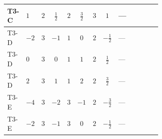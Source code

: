 \documentclass[8pt]{article}
\begin{document}
\begin{landscape}
\begin{longtable}{@{}llcccccc >{\raggedright\arraybackslash}p{0.21\linewidth} >{\raggedright\arraybackslash}p{0.21\linewidth} >{\raggedright\arraybackslash}p{0.21\linewidth}@{}}
\midrule
T3-C & $1$ & $2$ & $\frac{1}{2}$ & $2$ & $\frac{3}{2}$ & $3$ & $1$ & --- & \scriptsize\adjustbox{max width=\linewidth}{$\begin{gathered} +4 {\lambda_{12}^{(1)}}^2\end{gathered}$} & \scriptsize\adjustbox{max width=\linewidth}{$\begin{gathered} +4 {\lambda_{HS_1}^{(1)}}^2\end{gathered}$} \\
\midrule
T3-D & $-2$ & $3$ & $-1$ & $1$ & $0$ & $2$ & $-\frac{1}{2}$ & --- & \scriptsize\adjustbox{max width=\linewidth}{$\begin{gathered} +2 {\lambda_{12}^{(1)}}^2\end{gathered}$} & \scriptsize\adjustbox{max width=\linewidth}{$\begin{gathered} +4 {\lambda_{HS_1}^{(1)}}^2\end{gathered}$} \\
\midrule
T3-D & $0$ & $3$ & $0$ & $1$ & $1$ & $2$ & $\frac{1}{2}$ & --- & \scriptsize\adjustbox{max width=\linewidth}{$\begin{gathered} +2 {\lambda_{12}^{(1)}}^2\end{gathered}$} & \scriptsize\adjustbox{max width=\linewidth}{$\begin{gathered} +4 {\lambda_{HS_1}^{(1)}}^2\end{gathered}$} \\
\midrule
T3-D & $2$ & $3$ & $1$ & $1$ & $2$ & $2$ & $\frac{3}{2}$ & --- & \scriptsize\adjustbox{max width=\linewidth}{$\begin{gathered} +2 {\lambda_{12}^{(1)}}^2\end{gathered}$} & \scriptsize\adjustbox{max width=\linewidth}{$\begin{gathered} +4 {\lambda_{HS_1}^{(1)}}^2\end{gathered}$} \\
\midrule
T3-E & $-4$ & $3$ & $-2$ & $3$ & $-1$ & $2$ & $-\frac{3}{2}$ & --- & \scriptsize\adjustbox{max width=\linewidth}{$\begin{gathered} +6 {\lambda_{12}^{(1)}}^2\end{gathered}$} & \scriptsize\adjustbox{max width=\linewidth}{$\begin{gathered} +4 {\lambda_{HS_1}^{(1)}}^2\end{gathered}$} \\
\midrule
T3-E & $-2$ & $3$ & $-1$ & $3$ & $0$ & $2$ & $-\frac{1}{2}$ & --- & \scriptsize\adjustbox{max width=\linewidth}{$\begin{gathered} +6 {\lambda_{12}^{(1)}}^2\end{gathered}$} & \scriptsize\adjustbox{max width=\linewidth}{$\begin{gathered} +4 {\lambda_{HS_1}^{(1)}}^2\end{gathered}$} \\

\end{longtable}
\end{landscape}
\end{document}

